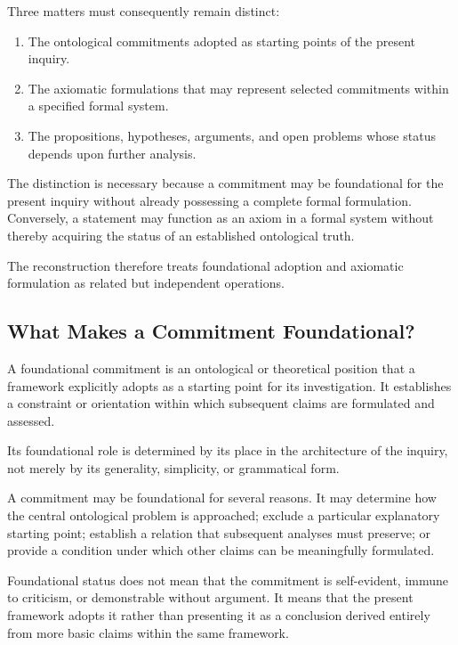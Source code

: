 Three matters must consequently remain distinct:

\begin{enumerate}
    \item The ontological commitments adopted as starting points
    of the present inquiry.

    \item The axiomatic formulations that may represent selected
    commitments within a specified formal system.

    \item The propositions, hypotheses, arguments, and open
    problems whose status depends upon further analysis.
\end{enumerate}

The distinction is necessary because a commitment may be
foundational for the present inquiry without already possessing
a complete formal formulation. Conversely, a statement may
function as an axiom in a formal system without thereby acquiring
the status of an established ontological truth.

The reconstruction therefore treats foundational adoption
and axiomatic formulation as related but independent operations.

\subsection{What Makes a Commitment Foundational?}

A foundational commitment is an ontological or theoretical
position that a framework explicitly adopts as a starting point
for its investigation. It establishes a constraint or orientation
within which subsequent claims are formulated and assessed.

Its foundational role is determined by its place in the
architecture of the inquiry, not merely by its generality,
simplicity, or grammatical form.

A commitment may be foundational for several reasons. It may
determine how the central ontological problem is approached;
exclude a particular explanatory starting point; establish a
relation that subsequent analyses must preserve; or provide
a condition under which other claims can be meaningfully
formulated.

Foundational status does not mean that the commitment is
self-evident, immune to criticism, or demonstrable without
argument. It means that the present framework adopts it
rather than presenting it as a conclusion derived entirely
from more basic claims within the same framework.

